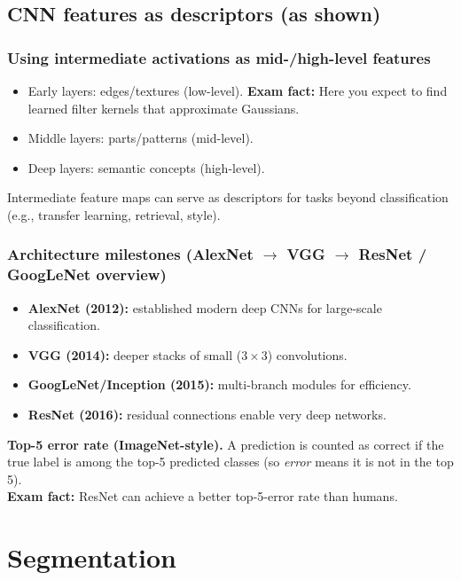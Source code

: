 \documentclass[11pt,a4paper]{article}
\begin{document}
\subsection{CNN features as descriptors (as shown)}
\subsubsection{Using intermediate activations as mid-/high-level features}
\begin{itemize}
  \item Early layers: edges/textures (low-level). \textbf{Exam fact:} Here you expect to find learned filter kernels that approximate Gaussians.
  \item Middle layers: parts/patterns (mid-level).
  \item Deep layers: semantic concepts (high-level).
\end{itemize}
Intermediate feature maps can serve as descriptors for tasks beyond classification (e.g., transfer learning, retrieval, style).

\subsubsection{Architecture milestones (AlexNet $\rightarrow$ VGG $\rightarrow$ ResNet / GoogLeNet overview)}
\begin{itemize}
  \item \textbf{AlexNet (2012):} established modern deep CNNs for large-scale classification.
  \item \textbf{VGG (2014):} deeper stacks of small ($3\times3$) convolutions.
  \item \textbf{GoogLeNet/Inception (2015):} multi-branch modules for efficiency.
  \item \textbf{ResNet (2016):} residual connections enable very deep networks.
\end{itemize}

\begin{notebox}
\textbf{Top-5 error rate (ImageNet-style).}
A prediction is counted as correct if the true label is among the top-5 predicted classes
(so \emph{error} means it is not in the top 5). \\
\textbf{Exam fact:} ResNet can achieve a better top-5-error rate than humans.
\end{notebox}

\section{Segmentation}
\end{document}
